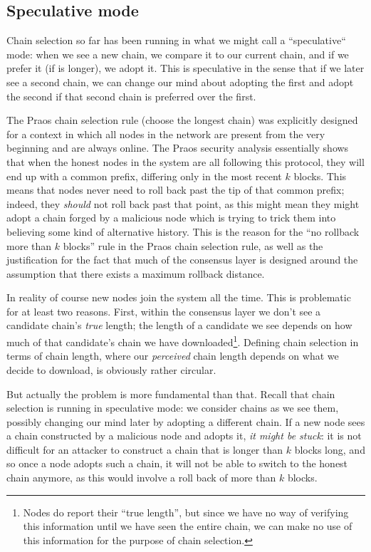 \subsection{Speculative mode}

Chain selection so far has been running in what we might call a ``speculative``
mode: when we see a new chain, we compare it to our current chain, and if we
prefer it (if is longer), we adopt it. This is speculative in the sense that
if we later see a second chain, we can change our mind about adopting the
first and adopt the second if that second chain is preferred over the first.

The Praos chain selection rule (choose the longest chain) was explicitly
designed for a context in which all nodes in the network are present from the
very beginning and are always online. The Praos security analysis
\cite{cryptoeprint:2017:573} essentially shows that when the honest nodes in the
system are all following this protocol, they will end up with a common prefix,
differing only in the most recent $k$ blocks. This means that nodes never need
to roll back past the tip of that common prefix; indeed, they \emph{should} not
roll back past that point, as this might mean they might adopt a chain forged by
a malicious node which is trying to trick them into believing some kind of
alternative history. This is the reason for the ``no rollback more than $k$
blocks'' rule in the Praos chain selection rule, as well as the justification
for the fact that much of the consensus layer is designed around the assumption
that there exists a maximum rollback distance.

In reality of course new nodes join the system all the time. This is problematic
for at least two reasons. First, within the consensus layer we don't see a
candidate chain's \emph{true} length; the length of a candidate we see depends
on how much of that candidate's chain we have downloaded\footnote{Nodes do
report their ``true length'', but since we have no way of verifying this
information until we have seen the entire chain, we can make no use of this
information for the purpose of chain selection.}. Defining chain
selection in terms of chain length, where our \emph{perceived} chain length
depends on what we decide to download, is obviously rather circular.

But actually the problem is more fundamental than that. Recall that chain
selection is running in speculative mode: we consider chains as we see them,
possibly changing our mind later by adopting a different chain. If a new node
sees a chain constructed by a malicious node and adopts it, \emph{it might be
stuck}: it is not difficult for an attacker to construct a chain that is longer
than $k$ blocks long, and so once a node adopts such a chain, it will not be
able to switch to the honest chain anymore, as this would involve a roll back
of more than $k$ blocks.

